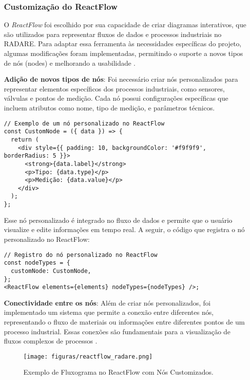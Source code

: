 \subsubsection{Customização do ReactFlow}

O \textit{ReactFlow} foi escolhido por sua capacidade de criar diagramas interativos, que são utilizados para representar fluxos de dados e processos industriais no RADARE. Para adaptar essa ferramenta às necessidades específicas do projeto, algumas modificações foram implementadas, permitindo o suporte a novos tipos de nós (nodes) e melhorando a usabilidade \cite{reactflowcustomization2024}.

\textbf{Adição de novos tipos de nós}: Foi necessário criar nós personalizados para representar elementos específicos dos processos industriais, como sensores, válvulas e pontos de medição. Cada nó possui configurações específicas que incluem atributos como nome, tipo de medição, e parâmetros técnicos.

\begin{verbatim}
// Exemplo de um nó personalizado no ReactFlow
const CustomNode = ({ data }) => {
  return (
    <div style={{ padding: 10, backgroundColor: '#f9f9f9', borderRadius: 5 }}>
      <strong>{data.label}</strong>
      <p>Tipo: {data.type}</p>
      <p>Medição: {data.value}</p>
    </div>
  );
};
\end{verbatim}

Esse nó personalizado é integrado no fluxo de dados e permite que o usuário visualize e edite informações em tempo real. A seguir, o código que registra o nó personalizado no ReactFlow:

\begin{verbatim}
// Registro do nó personalizado no ReactFlow
const nodeTypes = {
  customNode: CustomNode,
};
<ReactFlow elements={elements} nodeTypes={nodeTypes} />;
\end{verbatim}

\textbf{Conectividade entre os nós}: Além de criar nós personalizados, foi implementado um sistema que permite a conexão entre diferentes nós, representando o fluxo de materiais ou informações entre diferentes pontos de um processo industrial. Essas conexões são fundamentais para a visualização de fluxos complexos de processos \cite{processflowvisualization2024}.

\begin{figure}[htbp]
    \centering
    \texttt{[image: figuras/reactflow\_radare.png]}
    \caption{Exemplo de Fluxograma no ReactFlow com Nós Customizados.}
    \label{Fig:ReactFlow}
\end{figure}

